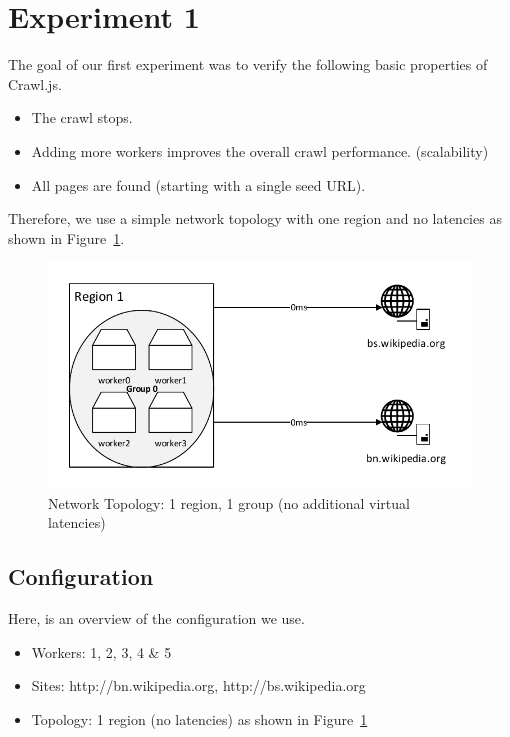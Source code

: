 \section{Experiment 1}

The goal of our first experiment was to verify the following basic properties of Crawl.js.

\begin{itemize}
  \item The crawl stops.
  \item Adding more workers improves the overall crawl performance. (scalability)
  \item All pages are found (starting with a single seed URL).
\end{itemize}

Therefore, we use a simple network topology with one region and no latencies as shown in Figure~\ref{topology_exp1}.

\begin{figure}[h]
\centering
  \includegraphics[width=1.0\textwidth]{Figures/topology_exp1.pdf}
  \caption{Network Topology: 1 region, 1 group (no additional virtual latencies)}
\label{topology_exp1}
\end{figure}

\subsection{Configuration}

Here, is an overview of the configuration we use.

\begin{itemize}
  \item Workers: 1, 2, 3, 4 \& 5
  \item Sites: http://bn.wikipedia.org, http://bs.wikipedia.org
  \item Topology: 1 region (no latencies) as shown in Figure~\ref{topology_exp1}
\end{itemize}

